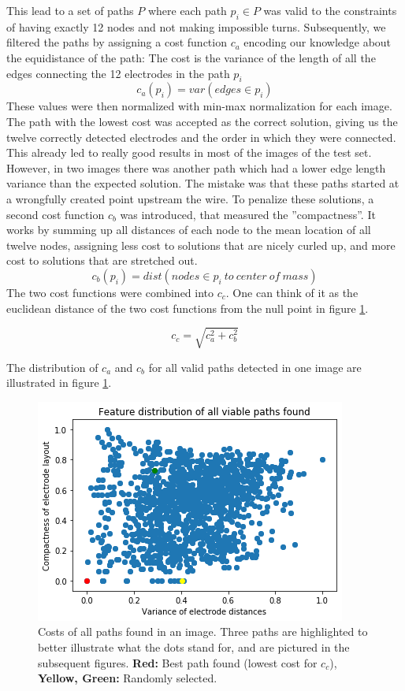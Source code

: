\documentclass[a4paper, 10pt, twocolumn]{article}
\begin{document}
This lead to a set of paths $P$ where each path $p_i \in P$ was valid to the constraints of having exactly 12 nodes and not making impossible turns. Subsequently, we filtered the paths by assigning a cost function $c_a$ encoding our knowledge about the equidistance of the path: The cost is the variance of the length of all the edges connecting the 12 electrodes in the path $p_i$
$$ c_a(p_i)=var(edges\in p_i)$$
These values were then normalized with min-max normalization for each image. The path with the lowest cost was accepted as the correct solution, giving us the twelve correctly detected electrodes and the order in which they were connected. This already led to really good results in most of the images of the test set. However, in two images there was another path which had a lower edge length variance than the expected solution. The mistake was that these paths started at a wrongfully created point upstream the wire. To penalize these solutions, a second cost function $c_b$ was introduced, that measured the ”compactness”. It works by summing up all distances of each node to the mean location of all twelve nodes, assigning less cost to solutions that are nicely curled up, and more cost to solutions that are stretched out.
$$ c_b(p_i)=dist (nodes \in p_i\ to\ center\ of\ mass)$$
The two cost functions were combined into $c_ {c}$. One can think of it as the euclidean distance of the two cost functions from the null point in figure \ref{feature_distribution}.

$$c_{c} = \sqrt{c_a^2+c_b^2}$$

The distribution of $c_a$ and $c_b$ for all valid paths detected in one image are illustrated in figure \ref{feature_distribution}.
\begin{figure}[ht]
	\centering
  \includegraphics[width=.5\textwidth]{feature_distribution.png}
	\caption{Costs of all paths found in an image. Three paths are highlighted to better illustrate what the dots stand for, and are pictured in the subsequent figures. \textbf{Red:} Best path found (lowest cost for $c_c$), \textbf{Yellow, Green:} Randomly selected.}
	\label{feature_distribution}
\end{figure}
\end{document}
